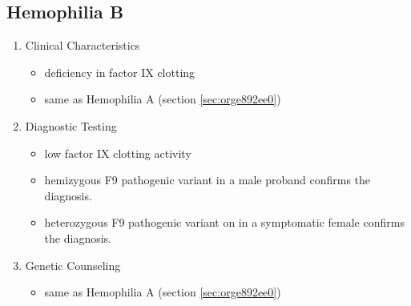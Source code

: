 \documentclass{scrartcl}
\begin{document}
\subsection{Hemophilia B}
\label{sec:orgccffc6b}
\begin{enumerate}
\item Clinical Characteristics
\label{sec:orgd916c5f}
\begin{itemize}
\item deficiency in factor IX clotting
\item same as Hemophilia A (section \ref{sec:orge892ee0})
\end{itemize}
\item Diagnostic Testing
\label{sec:orgf54b365}
\begin{itemize}
\item low factor IX clotting activity
\item hemizygous F9 pathogenic variant in a male proband confirms the
diagnosis.
\item heterozygous F9 pathogenic variant on in a symptomatic female
confirms the diagnosis.
\end{itemize}
\item Genetic Counseling
\label{sec:orgedc6096}
\begin{itemize}
\item same as Hemophilia A (section \ref{sec:orge892ee0})
\end{itemize}
\end{enumerate}
\end{document}
